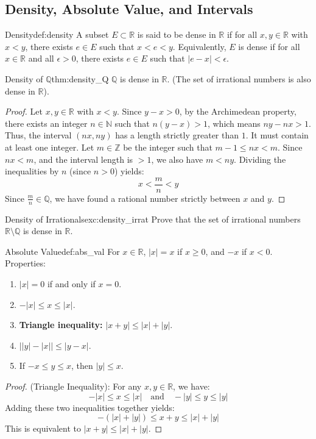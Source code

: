 \documentclass[11pt, a4paper]{article}
\newcommand{\R}{\mathbb{R}}
\newcommand{\Q}{\mathbb{Q}}
\begin{document}
\subsection{Density, Absolute Value, and Intervals}

\begin{definition}{Density}{def:density}
A subset $E \subset \mathbb{R}$ is said to be dense in $\mathbb{R}$ if for all $x, y \in \mathbb{R}$ with $x < y$, there exists $e \in E$ such that $x < e < y$. Equivalently, $E$ is dense if for all $x \in \mathbb{R}$ and all $\epsilon > 0$, there exists $e \in E$ such that $|e - x| < \epsilon$.
\end{definition}

\begin{theorem}{Density of $\mathbb{Q}$}{thm:density_Q}
$\mathbb{Q}$ is dense in $\mathbb{R}$. (The set of irrational numbers is also dense in $\mathbb{R}$).
\end{theorem}
\begin{proof}
Let $x, y \in \mathbb{R}$ with $x < y$. Since $y - x > 0$, by the Archimedean property, there exists an integer $n \in \mathbb{N}$ such that $n(y - x) > 1$, which means $ny - nx > 1$.
Thus, the interval $(nx, ny)$ has a length strictly greater than $1$. It must contain at least one integer.
Let $m \in \mathbb{Z}$ be the integer such that $m-1 \le nx < m$.
Since $nx < m$, and the interval length is $>1$, we also have $m < ny$.
Dividing the inequalities by $n$ (since $n > 0$) yields:
$$ x < \frac{m}{n} < y $$
Since $\frac{m}{n} \in \mathbb{Q}$, we have found a rational number strictly between $x$ and $y$.
\end{proof}

\begin{problem}{Density of Irrationals}{exc:density_irrat}
Prove that the set of irrational numbers $\R \setminus \Q$ is dense in $\R$.
\end{problem}

\begin{definition}{Absolute Value}{def:abs_val}
For $x \in \mathbb{R}$, $|x| = x$ if $x \ge 0$, and $-x$ if $x < 0$.
Properties:
\begin{enumerate}
    \item $|x| = 0$ if and only if $x = 0$.
    \item $-|x| \le x \le |x|$.
    \item \textbf{Triangle inequality:} $|x + y| \le |x| + |y|$.
    \item $\big| |y| - |x| \big| \le |y - x|$.
    \item If $-x \le y \le x$, then $|y| \le x$.
\end{enumerate}
\end{definition}
\begin{proof}
(Triangle Inequality): For any $x, y \in \mathbb{R}$, we have:
$$ -|x| \le x \le |x| \quad \text{and} \quad -|y| \le y \le |y| $$
Adding these two inequalities together yields:
$$ -(|x| + |y|) \le x + y \le |x| + |y| $$
This is equivalent to $|x + y| \le |x| + |y|$.
\end{proof}
\end{document}
